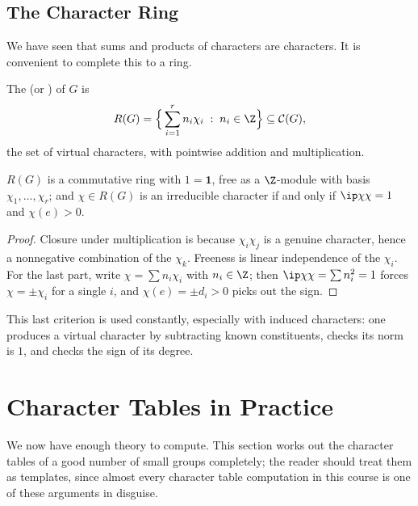 \subsection{The Character Ring}

We have seen that sums and products of characters are characters. It is convenient to complete this to a ring.

\begin{definition}
	The  (or ) of $G$ is
	$$R(G) = \Big\{\sum_{i=1}^r n_i\chi_i \; : \; n_i \in \Z\Big\} \subseteq \mathcal{C}(G),$$
	the set of virtual characters, with pointwise addition and multiplication.
\end{definition}

\begin{proposition}
	$R(G)$ is a commutative ring with $1 = \mathbf 1$, free as a $\Z$-module with basis $\chi_1,\dots,\chi_r$; and $\chi \in R(G)$ is an irreducible character if and only if $\ip\chi\chi = 1$ and $\chi(e) > 0$.
\end{proposition}
\begin{proof}
	Closure under multiplication is because $\chi_i\chi_j$ is a genuine character, hence a nonnegative combination of the $\chi_k$. Freeness is linear independence of the $\chi_i$. For the last part, write $\chi = \sum n_i\chi_i$ with $n_i\in\Z$; then $\ip\chi\chi = \sum n_i^2 = 1$ forces $\chi = \pm\chi_i$ for a single $i$, and $\chi(e) = \pm d_i > 0$ picks out the sign.
\end{proof}

This last criterion is used constantly, especially with induced characters: one produces a virtual character by subtracting known constituents, checks its norm is $1$, and checks the sign of its degree.

\section{Character Tables in Practice}

We now have enough theory to compute. This section works out the character tables of a good number of small groups completely; the reader should treat them as templates, since almost every character table computation in this course is one of these arguments in disguise.

